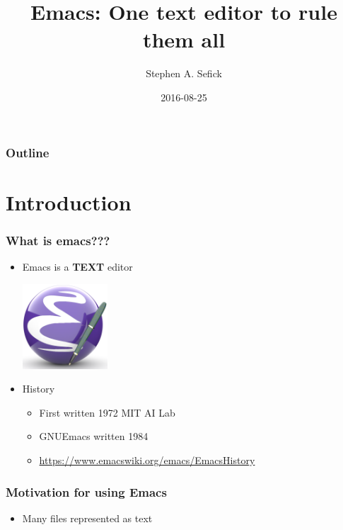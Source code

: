 \documentclass[t,10pt]{beamer}
\title{Emacs: One text editor to rule them all}
\author{Stephen A. Sefick}
\date{2016-08-25}
\begin{document}
\maketitle

\begin{frame}
\frametitle{Outline}
\setcounter{tocdepth}{2}
\tableofcontents
\end{frame}












\section{Introduction}
\label{sec-1}
\begin{frame}
\frametitle{What is emacs???}
\label{sec-1-1}
\begin{itemize}

\item Emacs is a \textbf{TEXT} editor\\
\label{sec-1-1-1}%
\vspace{0.25in}

\includegraphics[width=0.25\textwidth]{./emacs5-512.png}


\item History
\label{sec-1-1-2}%
\begin{itemize}
\item First written 1972 MIT AI Lab
\item GNUEmacs written 1984
\item \href{https://www.emacswiki.org/emacs/EmacsHistory}{https://www.emacswiki.org/emacs/EmacsHistory}
\end{itemize}

  
\end{itemize} %
\end{frame}
\begin{frame}
\frametitle{Motivation for using Emacs}
\label{sec-1-2}

\begin{itemize}
\item Many files represented as text
\end{itemize}
\end{frame}
\end{document}
